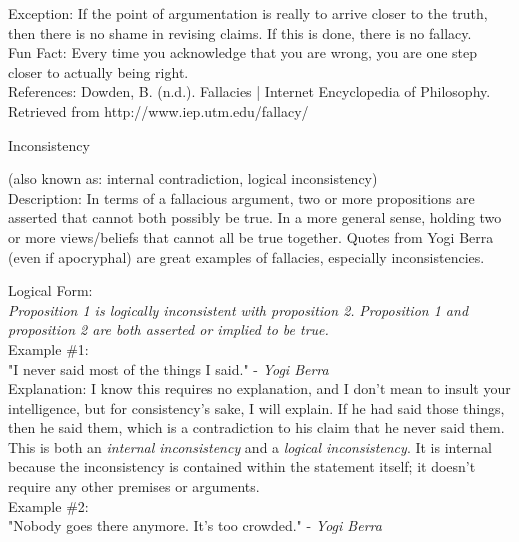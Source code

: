\documentclass[a4paper,12pt,single,pdftex]{scrbook}
\begin{document}
    
      Exception: If the point of argumentation is really to arrive closer to the truth, then there is no shame in revising claims.  If this is done, there is no fallacy.
    \\

    
      Fun Fact: Every time you acknowledge that you are wrong, you are one step closer to actually being right.
    \\

    References: Dowden, B. (n.d.). Fallacies | Internet Encyclopedia of Philosophy. Retrieved from http://www.iep.utm.edu/fallacy/
  

Inconsistency
    
      (also known as: internal contradiction, logical inconsistency)
    \\

  
    Description: In terms of a fallacious argument, two or more propositions are asserted that cannot both possibly be true.  In a more general sense, holding two or more views/beliefs that cannot all be true together.  Quotes from Yogi Berra (even if apocryphal) are great examples of fallacies, especially inconsistencies.

    
      Logical Form:
    \\

    
      {\em Proposition 1 is logically inconsistent with proposition 2.} \newline
{\em Proposition 1 and proposition 2 are both asserted or implied to be true.}
    \\

    
      Example \#1: 
    \\

    
      "I never said most of the things I said." - {\it Yogi Berra}
    \\

    
      Explanation: I know this requires no explanation, and I don't mean to insult your intelligence, but for consistency's sake, I will explain.  If he had said those things, then he said them, which is a contradiction to his claim that he never said them. This is both an {\it internal inconsistency} and a {\it logical inconsistency}. It is internal because the inconsistency is contained within the statement itself; it doesn't require any other premises or arguments.
    \\

    
      Example \#2: 
    \\

    
      "Nobody goes there anymore.  It's too crowded." - {\it Yogi Berra}
    \\
\end{document}
